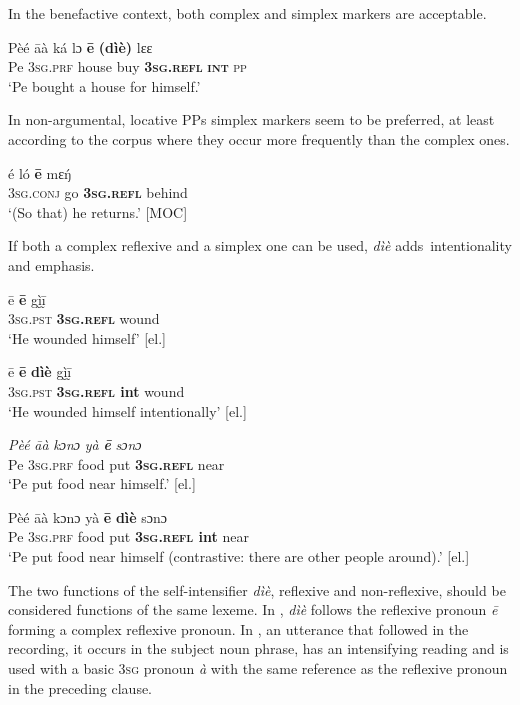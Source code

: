 \documentclass[output=paper]{langscibook}
\begin{document}
In the benefactive context, both complex and simplex markers are acceptable.

\ea
    \label{ex:Kachaturyan:12} 
 \gll Pèé  āà  ká  lɔ  \textbf{ē}  \textbf{(dìè)}  lɛɛ  \\
     Pe  \textsc{3sg.prf}  house    buy  \textbf{\textsc{3sg.refl}}  \textbf{\textsc{int}}  \textsc{pp}  \\
\glt ‘Pe bought a house for himself.’
\z

In non-argumental, locative PPs simplex markers seem to be preferred, at least according to the corpus where they occur more frequently than the complex ones. 

\ea
    \label{ex:Kachaturyan:13} 
 \gll é  ló  \textbf{ē}  mɛ\'{ŋ}\\
     3\textsc{sg.conj}    go  \textbf{\textsc{3sg.refl}}  behind\\
\glt ‘(So that) he returns.’ [MOC]
\z

If both a complex reflexive and a simplex one can be used, \textit{dìè} adds~intentionality and emphasis.


 \ea
    \label{ex:Kachaturyan:14} 
    \ea
    \label{ex:Kachaturyan:14a}
\gll ē  \textbf{ē}  gḭ̀ḭ̄  \\
     \textsc{3sg.pst}  \textbf{\textsc{3sg.refl}}  wound\\
\glt ‘He wounded himself’ [el.]


 \ex
    \label{ex:Kachaturyan:14b} 
\gll ē  \textbf{ē}  \textbf{dìè}  gḭ̀ḭ̄  \\
     \textsc{3sg.pst}  \textbf{\textsc{3sg.refl}  \textbf{int}}  wound\\
\glt ‘He wounded himself intentionally’ [el.]
\z
\z

\ea
    \label{ex:Kachaturyan:15} 
    \ea
    \label{ex:Kachaturyan:15a} 
     \textit{Pèé}  \textit{āà}  \textit{kɔnɔ}  \textit{yà}  \textbf{\textit{ē}}  \textit{sɔnɔ}\\
     Pe  \textsc{3sg.prf}  food  put  \textbf{\textsc{3sg.refl}}  near\\
\glt ‘Pe put food near himself.’ [el.]

    \ex
    \label{ex:Kachaturyan:15b} 
\gll Pèé  āà  kɔnɔ  yà  \textbf{ē}  \textbf{dìè}  sɔnɔ\\
     Pe  \textsc{3sg.prf}  food  put  \textbf{\textsc{3sg.refl}  \textbf{int}  }near\\
\glt ‘Pe put food near himself (contrastive: there are other people around).’ [el.] \z
\z

The two functions of the self-intensifier \textit{dìè}, reflexive and non-reflexive, should be considered functions of the same lexeme. In , \textit{dìè} follows the reflexive pronoun \textit{ē} forming a complex reflexive pronoun. In , an utterance that followed  in the recording, it occurs in the subject noun phrase, has an intensifying reading and is used with a basic 3\textsc{sg} pronoun \textit{à} with the same reference as the reflexive pronoun in the preceding clause.
\end{document}
